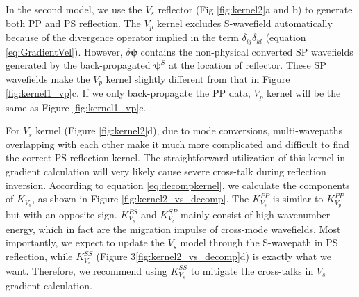 In the second model, we use the $V_s$ reflector (Fig \ref{fig:kernel2}a and b) to generate both PP
and PS reflection.
The $V_p$ kernel excludes S-wavefield automatically because of the divergence operator 
implied in the term $\delta_{ij}\delta_{kl}$ (equation \eqref{eq:GradientVel}). 
However, $\delta \boldsymbol{\psi}$ contains the non-physical converted SP wavefields 
generated by the back-propagated  $\boldsymbol{\psi}^S$ at the location of reflector.
These SP wavefields make the $V_p$ kernel slightly different from that in Figure \ref{fig:kernel1_vp}c.
If we only back-propagate the PP data, $V_p$ kernel will be the same as Figure \ref{fig:kernel1_vp}c.

For $V_s$ kernel (Figure \ref{fig:kernel2}d), due to mode conversions, multi-wavepaths overlapping with each other 
make it much more complicated and difficult to find the correct PS reflection kernel. 
The straightforward utilization of this kernel in gradient calculation will very likely cause severe
cross-talk during reflection inversion.
According to equation
\eqref{eq:decompkernel}, we calculate the components of $K_{V_s}$, as shown in Figure
\ref{fig:kernel2_vs_decomp}. The $K^{PP}_{V_s}$ is similar to $K^{PP}_{V_p}$ but with an opposite
sign. $K^{PS}_{V_s}$ and $K^{SP}_{V_s}$ mainly consist of high-wavenumber energy, which in fact are
the migration impulse of cross-mode wavefields. Most importantly, 
we expect to update the $V_s$ model through the S-wavepath in PS reflection, while
$K^{SS}_{V_s}$ (Figure 3\ref{fig:kernel2_vs_decomp}d) is exactly what we want.
Therefore, we recommend using $K^{SS}_{V_s}$ to mitigate the cross-talks in $V_s$ gradient calculation.


